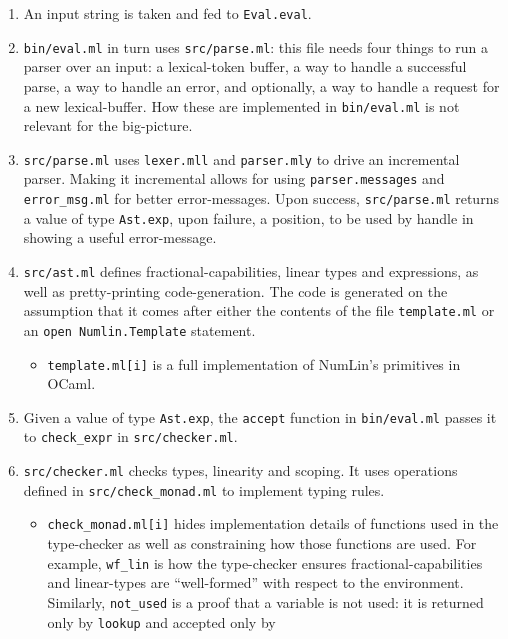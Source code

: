 \documentclass[a4paper,UKenglish]{lipics-v2019}
\begin{document}
\begin{enumerate}
\def\labelenumi{\arabic{enumi}.}
\item
  An input string is taken and fed to \texttt{Eval.eval}.
\item
  \texttt{bin/eval.ml} in turn uses \texttt{src/parse.ml}: this file
  needs four things to run a parser over an input: a lexical-token
  buffer, a way to handle a successful parse, a way to handle an error,
  and optionally, a way to handle a request for a new lexical-buffer.
  How these are implemented in \texttt{bin/eval.ml} is not relevant for
  the big-picture.
\item
  \texttt{src/parse.ml} uses \texttt{lexer.mll} and \texttt{parser.mly}
  to drive an incremental parser. Making it incremental allows for using
  \texttt{parser.messages} and \texttt{error\_msg.ml} for better
  error-messages. Upon success, \texttt{src/parse.ml} returns a value of
  type \texttt{Ast.exp}, upon failure, a position, to be used by handle
  in showing a useful error-message.
\item
  \texttt{src/ast.ml} defines fractional-capabilities, linear types and
  expressions, as well as pretty-printing code-generation. The code is
  generated on the assumption that it comes after either the contents of
  the file \texttt{template.ml} or an \texttt{open\ Numlin.Template}
  statement.
  \begin{itemize}
  \item
    \texttt{template.ml{[}i{]}} is a full implementation of NumLin's
    primitives in OCaml.
  \end{itemize}
\item
  Given a value of type \texttt{Ast.exp}, the \texttt{accept} function
  in \texttt{bin/eval.ml} passes it to \texttt{check\_expr} in
  \texttt{src/checker.ml}.
\item
  \texttt{src/checker.ml} checks types, linearity and scoping. It uses
  operations defined in \texttt{src/check\_monad.ml} to implement typing
  rules.
  \begin{itemize}
  \item
    \texttt{check\_monad.ml{[}i{]}} hides implementation details of
    functions used in the type-checker as well as constraining how those
    functions are used. For example, \texttt{wf\_lin} is how the
    type-checker ensures fractional-capabilities and linear-types are
    ``well-formed'' with respect to the environment. Similarly,
    \texttt{not\_used} is a proof that a variable is not used: it is
    returned only by \texttt{lookup} and accepted only by

\end{itemize}
\end{enumerate}
\end{document}
